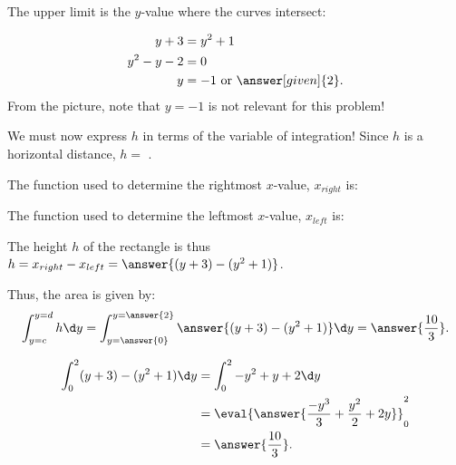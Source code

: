 \documentclass{ximera}
\begin{document}
\begin{exercise}
\begin{exercise}
\begin{hint}
 The upper limit is the $y$-value where the curves intersect: 
 
   \begin{align*}
    y+3 &= y^2 +1\\
  y^2-y-2 &= 0\\
    y &= -1 \text{ or }\answer[given]{2}.
  \end{align*}
  From the picture, note that $y=-1$ is not relevant for this problem!
\end{hint}

We must now express $h$ in terms of the variable of integration!  Since $h$ is a horizontal distance, $h=$ .
\end{exercise}

\begin{exercise}

The function used to determine the rightmost $x$-value, $x_{right}$ is:
\begin{multipleChoice}
\end{multipleChoice}

The function used to determine  the leftmost $x$-value, $x_{left}$ is:
\begin{multipleChoice}
\end{multipleChoice}

The height $h$ of the rectangle is thus $h=x_{right}-x_{left} = \answer{(y+3)-(y^2+1)}$.
\end{exercise}

\begin{exercise}

Thus, the area is given by:
  \[
 \int_{y=c}^{y=d} h \d y =  \int_{y=\answer{0}}^{y=\answer{2}} \answer{(y+3) - (y^2+1)} \d y = \answer{\frac{10}{3}}.
  \]
  \begin{hint}
    \begin{align*}
      \int_0^2 (y+3) - (y^2+1) \d y &= \int_0^2 -y^2+y+2 \d y\\
      &=\eval{\answer{\frac{-y^3}{3} + \frac{y^2}{2}+2y}}_0^2\\
      &=\answer{\frac{10}{3}}.
    \end{align*}
  \end{hint}

\end{exercise}

\end{exercise}
\end{document}
